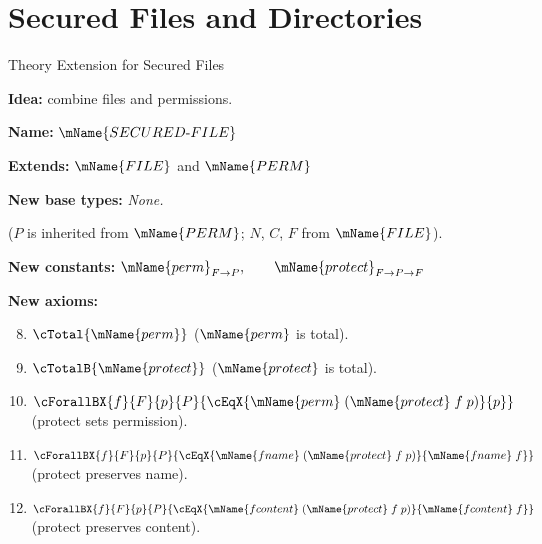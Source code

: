 \documentclass[aspectratio=169]{beamer}
\newcommand{\PERM}{\mName{PERM}}
\newcommand{\FILETYPE}{\mName{FILE}}
\newcommand{\SECFILE}{\mName{SECURED\text{-}FILE}}
\newcommand{\fname}{\mName{fname}}
\newcommand{\fcontent}{\mName{fcontent}}
\newcommand{\perm}{\mName{perm}}
\newcommand{\prot}{\mName{protect}}
\begin{document}
\section{Secured Files and Directories}

\begin{frame}{ Theory Extension for Secured Files}

\textbf{Idea:} combine files and permissions.  %

\medskip
\textbf{Name:} $\SECFILE$

\textbf{Extends:} $\FILETYPE$ and $\PERM$

\medskip
\textbf{New base types:} \emph{None.}

($P$ is inherited from $\PERM$; $N$, $C$, $F$ from $\FILETYPE$).

\medskip
\textbf{New constants:}
$\perm_{F \to P},\qquad
\prot_{F \to P \to F}$

\textbf{New axioms:}
\begin{enumerate}\setcounter{enumi}{7}
    \item $\cTotal{\perm}$
    \hfill ($\perm$ is total).
    \item $\cTotalB{\prot}$
    \hfill ($\prot$ is total).
    \item $\cForallBX{f}{F}{p}{P}{
        \cEqX{\perm\;(\prot\;f\;p)}{p}}$
    \hfill (protect sets permission).
    \item $\cForallBX{f}{F}{p}{P}{
      \cEqX{\fname\;(\prot\;f\;p)}{\fname\;f}}$
    \hfill (protect preserves name).
    \item $\cForallBX{f}{F}{p}{P}{
      \cEqX{\fcontent\;(\prot\;f\;p)}{\fcontent\;f}}$
    \hfill (protect preserves content).
\end{enumerate}
\end{frame}
\end{document}
